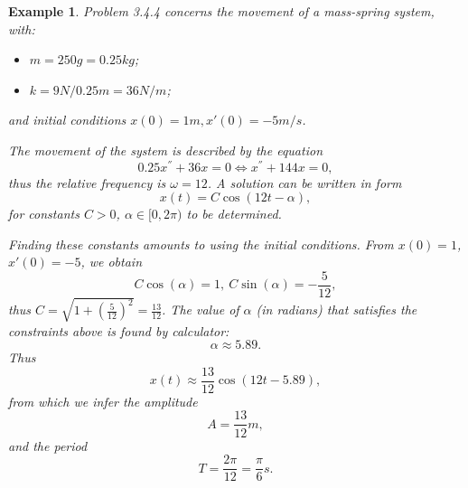 \documentclass[11pt]{amsart}
\newtheorem{example}{Example}
\numberwithin{equation}{section}
\begin{document}
\begin{example}
Problem 3.4.4 concerns the movement of a mass-spring system, with:
\begin{itemize}
\item $m=250g=0.25kg$;
\item $k=9N/0.25m = 36N/m$;
\end{itemize}
and initial conditions $x(0)=1m, x'(0)=-5m/s$.

The movement of the system is described by the equation
\begin{equation*}
0.25x^{''}+36x=0 \Leftrightarrow x^{''}+144x=0,
\end{equation*}
thus the relative frequency is $\omega=12$. A solution can be written in form
\begin{equation*}
x(t)=C\cos(12t-\alpha),
\end{equation*}
for constants $C>0$, $\alpha\in [0,2\pi)$ to be determined.

Finding these constants amounts to using the initial conditions. From $x(0)=1$, $x'(0)=-5$, we obtain
\begin{equation*}
C\cos(\alpha)  =1, \  C\sin(\alpha)  = -\frac{5}{12},
\end{equation*}
thus $C=\sqrt{1+\left(\frac{5}{12}\right)^2}=\frac{13}{12}$. The value of $\alpha$ (in radians) that satisfies the constraints above is found by calculator:
\begin{equation*}
\alpha \approx 5.89.
\end{equation*}
Thus 
\begin{equation*}
x(t)\approx \frac{13}{12}\cos(12t-5.89),
\end{equation*}
from which we infer the amplitude
\begin{equation*}
A=\frac{13}{12}m,
\end{equation*}
and the period
\begin{equation*}
T=\frac{2\pi}{12}=\frac{\pi}{6}s.
\end{equation*}
\end{example}
\end{document}
